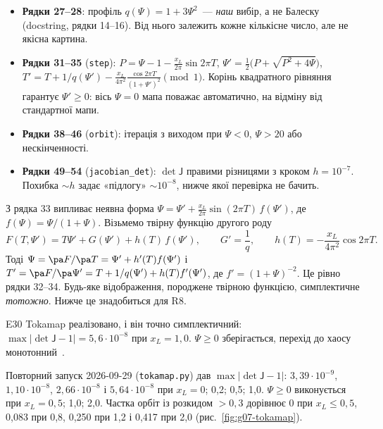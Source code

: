 
\begin{itemize}
\item \textbf{Рядки 27--28}: профіль $q(\Psi)=1+3\Psi^2$~--- \emph{наш} вибір, а не Балеску (docstring, рядки 14--16). Від нього залежить кожне кількісне число, але не якісна картина.
\item \textbf{Рядки 31--35} (\texttt{step}): $P=\Psi-1-\frac{x_L}{2\pi}\sin2\pi T$, $\Psi'=\tfrac12\big(P+\sqrt{P^2+4\Psi}\big)$, $T'=T+1/q(\Psi')-\frac{x_L}{4\pi^2}\frac{\cos2\pi T}{(1+\Psi')^2}\pmod 1$. Корінь квадратного рівняння гарантує $\Psi'\ge0$: вісь $\Psi=0$ мапа поважає автоматично, на відміну від стандартної мапи.
\item \textbf{Рядки 38--46} (\texttt{orbit}): ітерація з виходом при $\Psi<0$, $\Psi>20$ або нескінченності.
\item \textbf{Рядки 49--54} (\texttt{jacobian\_det}): $\det\mathsf J$ правими різницями з кроком $h=10^{-7}$. Похибка $\sim h$ задає «підлогу» $\sim10^{-8}$, нижче якої перевірка не бачить.
\end{itemize}

\begin{derivation}
З рядка 33 випливає неявна форма $\Psi=\Psi'+\frac{x_L}{2\pi}\sin(2\pi T)\,f(\Psi')$, де $f(\Psi)=\Psi/(1+\Psi)$. Візьмемо твірну функцію другого роду
\[
  F(T,\Psi')=T\Psi'+G(\Psi')+h(T)\,f(\Psi'),\qquad G'=\frac1q,\qquad h(T)=-\frac{x_L}{4\pi^2}\cos2\pi T .
\]
Тоді $\Psi=\pa F/\pa T=\Psi'+h'(T)f(\Psi')$ і $T'=\pa F/\pa\Psi'=T+1/q(\Psi')+h(T)f'(\Psi')$, де $f'=(1+\Psi)^{-2}$. Це рівно рядки 32--34. Будь-яке відображення, породжене твірною функцією, симплектичне \emph{тотожно}. Нижче це знадобиться для R8.
\end{derivation}

\begin{established}{E30}
Tokamap реалізовано, і він точно симплектичний: $\max|\det\mathsf J-1|=5{,}6\cdot10^{-8}$ при $x_L=1{,}0$. $\Psi\ge0$ зберігається, перехід до хаосу монотонний~\cite{RegEst}.
\end{established}

Повторний запуск 2026-09-29 (\texttt{tokamap.py}) дав $\max|\det\mathsf J-1|$: $3{,}39\cdot10^{-9}$, $1{,}10\cdot10^{-8}$, $2{,}66\cdot10^{-8}$ і $5{,}64\cdot10^{-8}$ при $x_L=0$; 0,2; 0,5; 1,0. $\Psi\ge0$ виконується при $x_L=0{,}5$; 1,0; 2,0. Частка орбіт із розкидом $>0{,}3$ дорівнює 0 при $x_L\le0{,}5$, 0,083 при 0,8, 0,250 при 1,2 і 0,417 при 2,0 (рис.~\ref{fig:g07-tokamap}).

